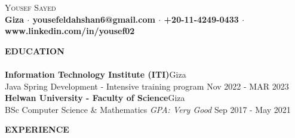 \documentclass[a4paper]{article}
\newcommand{\lineunder} {
    \vspace*{-5pt} \\
    \hspace*{-18pt} \hrulefill \\
}
\newcommand{\header} [1] {
    {\hspace*{-18pt}\vspace*{6pt} \textsc{#1}}
    \vspace*{-6pt} \lineunder
}
\begin{document}
\vspace*{-50pt}

    


\begin{center}
	{\Huge \scshape Yousef Sayed}\\
    \vspace{10pt}
	\textbf{Giza $\cdot$ yousefeldahshan6@gmail.com $\cdot$ +20-11-4249-0433 $\cdot$ www.linkedin.com/in/yousef02}\\
\end{center}
\vspace{20pt}
\header{\textbf{EDUCATION}}
\vspace{5pt}
\textbf{Information Technology Institute (ITI)}\hfill Giza\\
Java Spring Development - Intensive training program \hfill Nov 2022 - MAR 2023\\

\vspace{10pt}
\textbf{Helwan University - Faculty of Science}\hfill Giza\\
BSc Computer Science \& Mathematics \textit{GPA: Very Good} \hfill Sep 2017 - May 2021\\
\vspace{10pt}




\header{\textbf{EXPERIENCE}}

 \vspace{5pt}
\end{document}
